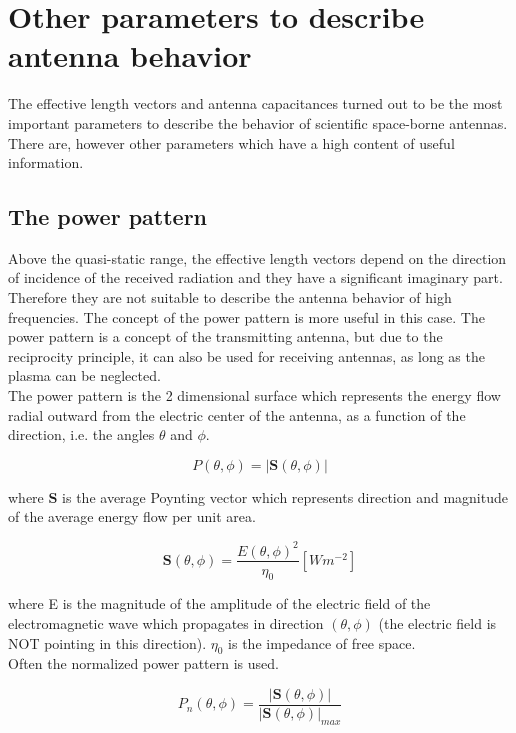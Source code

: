 \documentclass[a4paper,11pt]{report}
\begin{document}
\section{Other parameters to describe antenna behavior}
The effective length vectors and antenna capacitances turned out to be the most important parameters to describe the behavior of scientific space-borne antennas. There are, however other parameters which have a high content of useful information.

\subsection{The power pattern}
Above the quasi-static range, the effective length vectors depend on the direction of incidence of the received radiation and they have a significant imaginary part. Therefore they are not suitable to describe the antenna behavior of high frequencies. The concept of the power pattern is more useful in this case. The power pattern is a concept of the transmitting antenna, but due to the reciprocity principle, it can also be used for receiving antennas, as long as the plasma can be neglected.\\

The power pattern is the 2 dimensional surface which represents the energy flow radial outward from the electric center of the antenna, as a function of the direction, i.e. the angles $\theta$ and $\phi$.

\begin{equation}
 P(\theta,\phi)=|\mathbf{S}(\theta,\phi)|
\end{equation}

where $\mathbf{S}$ is the average Poynting vector which represents direction and magnitude of the average energy flow per unit area.

\begin{equation}
 \mathbf{S}(\theta,\phi)=\frac{E(\theta,\phi)^2}{\eta_0}[Wm^{-2}]
\end{equation}
 
where E is the magnitude of the amplitude of the electric field of the electromagnetic wave which propagates in direction $(\theta,\phi)$ (the electric field is NOT pointing in this direction). $\eta_0$ is the impedance of free space.\\

Often the normalized power pattern is used.

\begin{equation}
 P_n(\theta,\phi)=\frac{|\mathbf{S}(\theta,\phi)|}{|\mathbf{S}(\theta,\phi)|_{max}}
\end{equation}
\end{document}
